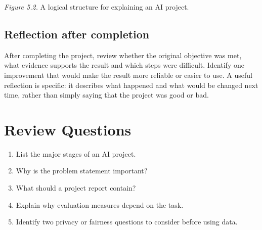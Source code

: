 \documentclass[11pt,openany,oneside]{book}
\begin{document}
\begin{center}
\end{center}
\textit{Figure 5.2.} A logical structure for explaining an AI project.

\subsection{Reflection after completion}
After completing the project, review whether the original objective was met, what evidence supports the result and which steps were difficult. Identify one improvement that would make the result more reliable or easier to use. A useful reflection is specific: it describes what happened and what would be changed next time, rather than simply saying that the project was good or bad.

\section*{Review Questions}
\begin{enumerate}
\item List the major stages of an AI project.
\item Why is the problem statement important?
\item What should a project report contain?
\item Explain why evaluation measures depend on the task.
\item Identify two privacy or fairness questions to consider before using data.
\end{enumerate}
\end{document}
